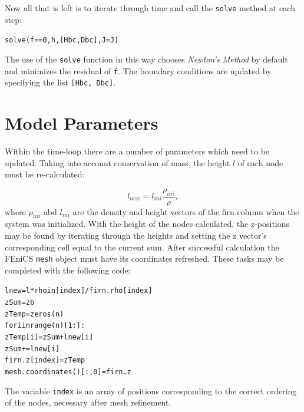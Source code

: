 \documentclass{article}%
\begin{document}
Now all that is left is to iterate through time and call the \texttt{solve} method at each step:\par
\footnotesize
\begin{alltt}
solve(f == 0, h, [Hbc, Dbc], J=J)
\end{alltt}
\normalsize
The use of the \texttt{solve} function in this way chooses \emph{Newton's Method} by default and minimizes the residual of \texttt{f}.  The boundary conditions are updated by specifying the list \texttt{[Hbc, Dbc]}.


\section{Model Parameters}

Within the time-loop there are a number of parameters which need to be updated.  Taking into account conservation of mass, the height $l$ of each node must be re-calculated:\par
  $$l_{new} = l_{ini} \frac{\rho_{ini}}{\rho},$$
where $\rho_{ini}$ abd $l_{ini}$ are the density and height vectors of the firn column when the system was initialized.  With the height of the nodes calculated, the z-positions may be found by iterating through the heights and setting the z vector's corresponding cell equal to the current sum.  After successful calculation the FEniCS \texttt{mesh} object must have its coordinates refreshed.  These tasks may be completed with the following code:\par
\footnotesize
\begin{alltt}
lnew     = l*rhoin[index] / firn.rho[index]
zSum     = zb
zTemp    = zeros(n)
for i in range(n)[1:]:
  zTemp[i] = zSum + lnew[i]
  zSum    += lnew[i]
firn.z[index] = zTemp
mesh.coordinates()[:,0] = firn.z
\end{alltt}
\normalsize
The variable \texttt{index} is an array of positions corresponding to the correct ordering of the nodes, necessary after mesh refinement.  
\end{document}
